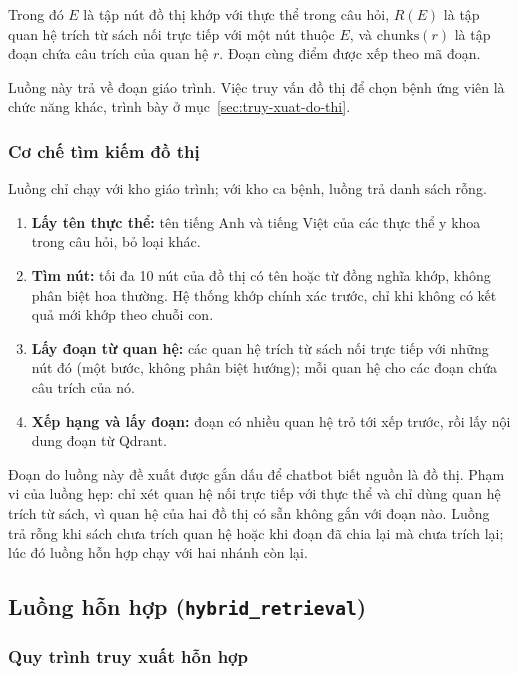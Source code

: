 Trong đó $E$ là tập nút đồ thị khớp với thực thể trong câu hỏi, $R(E)$ là tập quan hệ trích từ sách nối trực tiếp với một nút thuộc $E$, và $\mathrm{chunks}(r)$ là tập đoạn chứa câu trích của quan hệ $r$. Đoạn cùng điểm được xếp theo mã đoạn.

Luồng này trả về đoạn giáo trình. Việc truy vấn đồ thị để chọn bệnh ứng viên là chức năng khác, trình bày ở mục~\ref{sec:truy-xuat-do-thi}.

\subsubsection{Cơ chế tìm kiếm đồ thị}

Luồng chỉ chạy với kho giáo trình; với kho ca bệnh, luồng trả danh sách rỗng.
\begin{enumerate}
  \item \textbf{Lấy tên thực thể:} tên tiếng Anh và tiếng Việt của các thực thể y khoa trong câu hỏi, bỏ loại khác.
  \item \textbf{Tìm nút:} tối đa 10 nút của đồ thị có tên hoặc từ đồng nghĩa khớp, không phân biệt hoa thường. Hệ thống khớp chính xác trước, chỉ khi không có kết quả mới khớp theo chuỗi con.
  \item \textbf{Lấy đoạn từ quan hệ:} các quan hệ trích từ sách nối trực tiếp với những nút đó (một bước, không phân biệt hướng); mỗi quan hệ cho các đoạn chứa câu trích của nó.
  \item \textbf{Xếp hạng và lấy đoạn:} đoạn có nhiều quan hệ trỏ tới xếp trước, rồi lấy nội dung đoạn từ Qdrant.
\end{enumerate}


Đoạn do luồng này đề xuất được gắn dấu để chatbot biết nguồn là đồ thị. Phạm vi của luồng hẹp: chỉ xét quan hệ nối trực tiếp với thực thể và chỉ dùng quan hệ trích từ sách, vì quan hệ của hai đồ thị có sẵn không gắn với đoạn nào. Luồng trả rỗng khi sách chưa trích quan hệ hoặc khi đoạn đã chia lại mà chưa trích lại; lúc đó luồng hỗn hợp chạy với hai nhánh còn lại.

\subsection{Luồng hỗn hợp (\texttt{hybrid\_retrieval})}
\label{sec:luong-hon-hop}

\subsubsection{Quy trình truy xuất hỗn hợp}

